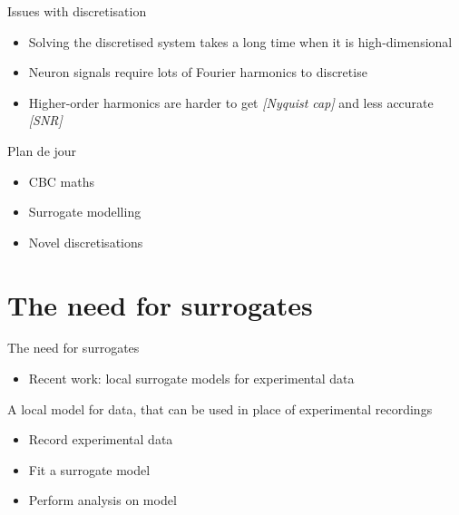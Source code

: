 \documentclass[presentation]{beamer}
\begin{document}
\begin{frame}[label={sec:org11c2542}]{Issues with discretisation}
\begin{itemize}
\item Solving the discretised system takes a long time when it is high-dimensional
\vfill
\item Neuron signals require lots of Fourier harmonics to discretise
\vfill
\item Higher-order harmonics are harder to get \emph{[Nyquist cap]} and less accurate \emph{[SNR]}
\end{itemize}
\end{frame}

\begin{frame}[label={sec:org2c4eb2a}]{Plan de jour}
\begin{itemize}
\item CBC maths
\item \alert{Surrogate modelling}
\item Novel discretisations
\end{itemize}
\end{frame}
\section{The need for surrogates}
\label{sec:org2385fc5}
\begin{frame}[<+->][label={sec:orgb89ebc6}]{The need for surrogates}
\begin{itemize}
\item Recent work: local surrogate models for experimental data
\end{itemize}

\vfill

\begin{definition}
A local model for data, that can be used in place of experimental recordings
\end{definition}

\vfill

\begin{itemize}
\item Record experimental data
\item Fit a surrogate model
\item Perform analysis on model
\end{itemize}
\end{frame}
\end{document}
